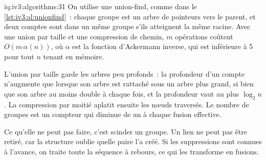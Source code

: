 \begin{solution}{iq:iv3:algorithms:31}
On utilise une union-find, comme dans le \cref{lst:iv3:al:unionfind}~: chaque groupe est un arbre de pointeurs vers le parent, et deux comptes sont dans un même groupe s'ils atteignent la même racine. Avec une union par taille et une compression de chemin, $m$ opérations coûtent $O(m\,\alpha(n))$, où $\alpha$ est la fonction d'Ackermann inverse, qui est inférieure à 5 pour tout $n$ tenant en mémoire.
\label{lst:iv3:al:unionfind}

L'union par taille garde les arbres peu profonds~: la profondeur d'un compte n'augmente que lorsque son arbre est rattaché sous un arbre plus grand, si bien que son arbre au moins double à chaque fois, et la profondeur vaut au plus $\log_2 n$. La compression par moitié aplatit ensuite les nœuds traversés. Le nombre de groupes est un compteur qui diminue de un à chaque fusion effective.

Ce qu'elle ne peut pas faire, c'est scinder un groupe. Un lien ne peut pas être retiré, car la structure oublie quelle paire l'a créé. Si les suppressions sont connues à l'avance, on traite toute la séquence à rebours, ce qui les transforme en fusions.

\end{solution}

